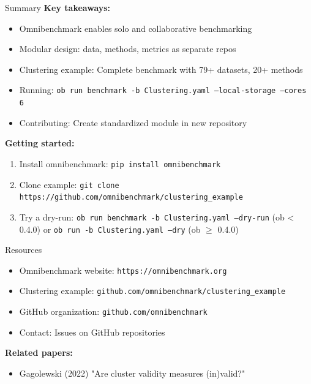 \documentclass[aspectratio=169]{beamer}
\begin{document}
\begin{frame}{Summary}
    \textbf{Key takeaways:}
    \begin{itemize}
        \item Omnibenchmark enables solo and collaborative benchmarking
        \item Modular design: data, methods, metrics as separate repos
        \item Clustering example: Complete benchmark with 79+ datasets, 20+ methods
        \item Running: \texttt{ob run benchmark -b Clustering.yaml --local-storage --cores 6}
        \item Contributing: Create standardized module in new repository
    \end{itemize}
    
    \vspace{0.3cm}
    \textbf{Getting started:}
    \begin{enumerate}
        \item Install omnibenchmark: \texttt{pip install omnibenchmark}
        \item Clone example: \texttt{git clone https://github.com/omnibenchmark/clustering\_example}
        \item Try a dry-run: \texttt{ob run benchmark -b Clustering.yaml --dry-run} (ob < 0.4.0) or \texttt{ob run -b Clustering.yaml --dry} (ob $\ge$ 0.4.0)
    \end{enumerate}
\end{frame}

\begin{frame}{Resources}
    \begin{itemize}
        \item Omnibenchmark website: \texttt{https://omnibenchmark.org}
        \item Clustering example: \texttt{github.com/omnibenchmark/clustering\_example}
        \item GitHub organization: \texttt{github.com/omnibenchmark}
        \item Contact: Issues on GitHub repositories
    \end{itemize}
    
    \vspace{0.3cm}
    \textbf{Related papers:}
    \begin{itemize}
        \item Gagolewski (2022) "Are cluster validity measures (in)valid?"
    \end{itemize}
\end{frame}
\end{document}
